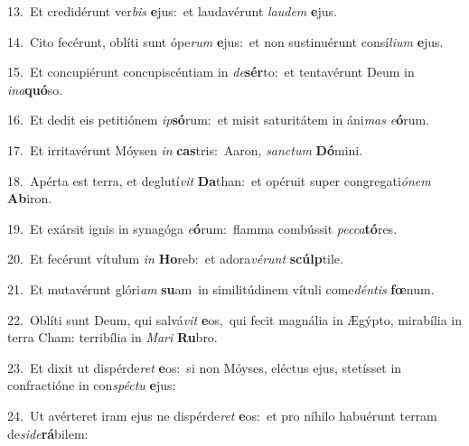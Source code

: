 {\numbfont\textcolor{\numbcolor}{13.}}~Et credidérunt ver\textit{bis} \textbf{e}\-jus:~\star et laudavérunt \textit{lau}\-\textit{dem} \textbf{e}\-jus.\par
{\numbfont\textcolor{\numbcolor}{14.}}~Cito fecérunt, oblíti sunt ópe\textit{rum} \textbf{e}\-jus:~\star et non sustinuérunt consí\-\textit{li}\-\textit{um} \textbf{e}\-jus.\par
{\numbfont\textcolor{\numbcolor}{15.}}~Et concupiérunt concupiscéntiam in \textit{de}\-\textbf{sér}to:~\star et tentavérunt Deum in \textit{in}\-\textit{a}\textbf{quó}so.\par
{\numbfont\textcolor{\numbcolor}{16.}}~Et dedit eis petitiónem \textit{ip}\-\textbf{só}rum:~\star et misit saturitátem in áni\textit{mas} \textit{e}\-\textbf{ó}rum.\par
{\numbfont\textcolor{\numbcolor}{17.}}~Et irritavérunt Móysen \textit{in} \textbf{cas}\-tris:~\star Aaron, \textit{sanc}\-\textit{tum} \textbf{Dó}\-mini.\par
{\numbfont\textcolor{\numbcolor}{18.}}~Apérta est terra, et deglutí\textit{vit} \textbf{Da}\-than:~\star et opéruit super congregati\-\textit{ó}\-\textit{nem} \textbf{Ab}\-iron.\par
{\numbfont\textcolor{\numbcolor}{19.}}~Et exársit ignis in synagóga \textit{e}\-\textbf{ó}rum:~\star flamma combússit \textit{pec}\-\textit{ca}\textbf{tó}res.\par
{\numbfont\textcolor{\numbcolor}{20.}}~Et fecérunt vítulum \textit{in} \textbf{Ho}\-reb:~\star et adora\-\textit{vé}\-\textit{runt} \textbf{scúlp}\-tile.\par
{\numbfont\textcolor{\numbcolor}{21.}}~Et mutavérunt glóri\textit{am} \textbf{su}\-am~\star in similitúdinem vítuli come\-\textit{dén}\-\textit{tis} \textbf{fœ}\-num.\par
{\numbfont\textcolor{\numbcolor}{22.}}~Oblíti sunt Deum, qui salvá\textit{vit} \textbf{e}\-os,~\star qui fecit magnália in Ægýpto, mirabília in terra Cham: terribília in \textit{Ma}\-\textit{ri} \textbf{Ru}\-bro.\par
{\numbfont\textcolor{\numbcolor}{23.}}~Et dixit ut dispérde\textit{ret} \textbf{e}\-os:~\star si non Móyses, eléctus ejus, stetísset in confractióne in con\-\textit{spéc}\-\textit{tu} \textbf{e}\-jus:\par
{\numbfont\textcolor{\numbcolor}{24.}}~Ut avérteret iram ejus ne dispérde\textit{ret} \textbf{e}\-os:~\star et pro níhilo habuérunt terram de\-\textit{si}\-\textit{de}\textbf{rá}bilem:\par
